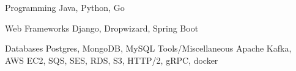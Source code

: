 

\begin{cvskills}

  \cvskill
    {Programming} %
    {Java, Python, Go} %

  \cvskill
    {Web Frameworks} %
    {Django, Dropwizard, Spring Boot} %

  \cvskill
    {Databases} %
    {Postgres, MongoDB, MySQL} %
  \cvskill
    {Tools/Miscellaneous} %
    {Apache Kafka, AWS EC2, SQS, SES, RDS, S3, HTTP/2, gRPC, docker} %

\end{cvskills}
